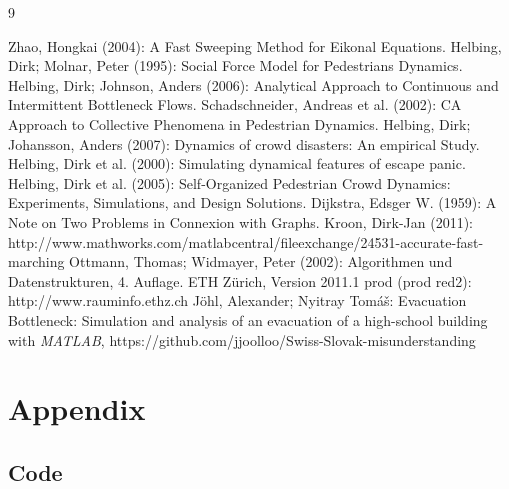 \documentclass[11pt]{article}
\begin{document}
\begin{thebibliography} {9}
	
	 Zhao, Hongkai (2004): A Fast Sweeping Method for Eikonal Equations.
	 Helbing, Dirk; Molnar, Peter (1995): Social Force Model for Pedestrians Dynamics.
	 Helbing, Dirk; Johnson, Anders (2006): Analytical Approach to Continuous and Intermittent Bottleneck Flows.
	 Schadschneider, Andreas et al. (2002): CA Approach to Collective Phenomena in Pedestrian Dynamics.	
	 Helbing, Dirk; Johansson, Anders (2007): Dynamics of crowd disasters: An empirical Study.
	 Helbing, Dirk et al. (2000): Simulating dynamical features of escape panic.
	 Helbing, Dirk et al. (2005): Self-Organized Pedestrian Crowd Dynamics: Experiments, Simulations, and Design Solutions.
	 Dijkstra, Edsger W. (1959): A Note on Two Problems in Connexion with Graphs.
	 Kroon, Dirk-Jan (2011): http://www.mathworks.com/matlabcentral/fileexchange/24531-accurate-fast-marching
	 Ottmann, Thomas; Widmayer, Peter (2002): Algorithmen und Datenstrukturen, 4. Auflage.
	 ETH Zürich, Version 2011.1 prod (prod red2): http://www.rauminfo.ethz.ch
	 Jöhl, Alexander; Nyitray Tom\'{a}\v{s}: Evacuation Bottleneck: Simulation and analysis of an evacuation of a high-school building with \textit{MATLAB}, https://github.com/jjoolloo/Swiss-Slovak-misunderstanding

\end{thebibliography}


\section{Appendix}

\subsection{Code}


\end{document}
